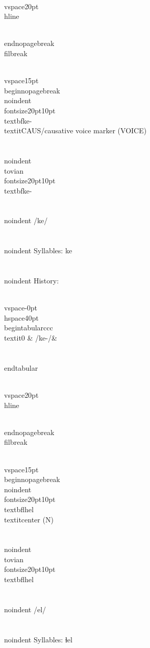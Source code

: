 \\vspace{20pt}\\hline

\\end{nopagebreak}
\\filbreak



\\vspace{15pt}
\\begin{nopagebreak}
\\noindent{\\fontsize{20pt}{10pt}\\textbf{ke-} } \\textit{CAUS/causative voice marker} (VOICE)\\\\
\\noindent {\\tovian \\fontsize{20pt}{10pt} \\textbf{ke-} }\\\\
\\noindent /k{\textprimstress}e/\\\\
\\noindent Syllables: ke\\\\


\\noindent History:

\\vspace{-0pt}
\\hspace{40pt}
\\begin{tabular}{ccc}
\\textit{0} & /ke-/& \\\\
\\end{tabular}

\\vspace{20pt}\\hline

\\end{nopagebreak}
\\filbreak



\\vspace{15pt}
\\begin{nopagebreak}
\\noindent{\\fontsize{20pt}{10pt}\\textbf{lhel} } \\textit{center} (N)\\\\
\\noindent {\\tovian \\fontsize{20pt}{10pt} \\textbf{lhel} }\\\\
\\noindent /{\textbeltl}{\textprimstress}el/\\\\
\\noindent Syllables: ɬel\\\\


